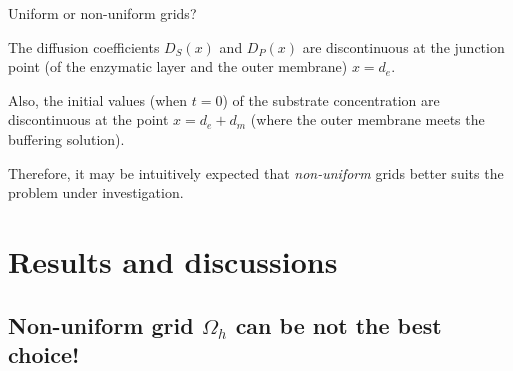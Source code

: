 \documentclass[hyperref={breaklinks=true},fleqn,mathserif]{beamer}
\begin{document}
\begin{frame}{Uniform or non-uniform grids?}

\begin{alertblock}{}
The diffusion coefficients $D_S(x)$ and $D_P(x)$ are discontinuous at the junction point (of the enzymatic layer and the outer membrane) $x=d_e$.

\smallskip
Also, the initial values (when $t=0$) of the substrate concentration are discontinuous at the point $x = d_e + d_m$ (where the outer membrane meets the buffering solution).

\smallskip
Therefore, it may be intuitively expected that \emph{non-uniform} grids better suits the problem under investigation.
\end{alertblock}

\medskip
{}

\end{frame}

\section{Results and discussions}

\subsection{Non-uniform grid $\Omega_h$ can be not the best choice!}
\end{document}
